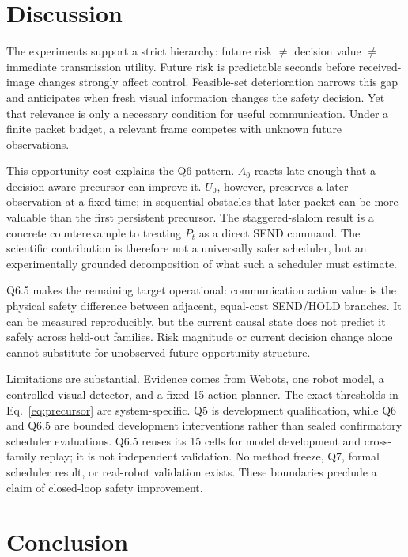 \documentclass[letterpaper,10pt,conference]{ieeeconf}
\begin{document}
\section{Discussion}

The experiments support a strict hierarchy: future risk $\neq$ decision value
$\neq$ immediate transmission utility.
Future risk is predictable seconds before received-image changes strongly
affect control. Feasible-set deterioration narrows this gap and anticipates
when fresh visual information changes the safety decision. Yet that relevance
is only a necessary condition for useful communication. Under a finite packet
budget, a relevant frame competes with unknown future observations.

This opportunity cost explains the Q6 pattern. $A_0$ reacts late enough that a
decision-aware precursor can improve it. $U_0$, however, preserves a later
observation at a fixed time; in sequential obstacles that later packet can be
more valuable than the first persistent precursor. The staggered-slalom result
is a concrete counterexample to treating $P_t$ as a direct SEND command. The
scientific contribution is therefore not a universally safer scheduler, but an
experimentally grounded decomposition of what such a scheduler must estimate.

Q6.5 makes the remaining target operational: communication action value is the
physical safety difference between adjacent, equal-cost SEND/HOLD branches.
It can be measured reproducibly, but the current causal state does not predict
it safely across held-out families. Risk magnitude or current decision change
alone cannot substitute for unobserved future opportunity structure.

Limitations are substantial. Evidence comes from Webots, one robot model, a
controlled visual detector, and a fixed 15-action planner. The exact thresholds
in Eq.~\eqref{eq:precursor} are system-specific. Q5 is development
qualification, while Q6 and Q6.5 are bounded development interventions rather
than sealed confirmatory scheduler evaluations. Q6.5 reuses its 15 cells for
model development and cross-family replay; it is not independent validation.
No method freeze, Q7, formal scheduler result, or real-robot validation exists.
These boundaries preclude a claim of closed-loop safety improvement.

\section{Conclusion}
\end{document}
